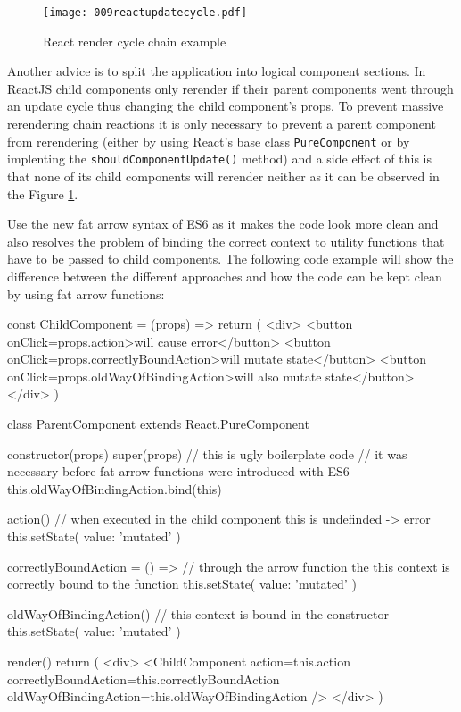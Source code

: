 \begin{figure}
  \centering
  \texttt{[image: 009reactupdatecycle.pdf]}
  \caption{React render cycle chain example}
  \label{fig:reactrerenderchainexample}
\end{figure}

Another advice is to split the application into logical component sections. In ReactJS child components only rerender if their parent components went through an update cycle thus changing the child component's props. To prevent massive rerendering chain reactions it is only necessary to prevent a parent component from rerendering (either by using React's base class \texttt{PureComponent} or by implenting the \texttt{shouldComponentUpdate()} method) and a side effect of this is that none of its child components will rerender neither as it can be observed in the Figure \ref{fig:reactrerenderchainexample}.

Use the new fat arrow syntax of ES6 as it makes the code look more clean and also resolves the problem of binding the correct context to utility functions that have to be passed to child components. The following code example will show the difference between the different approaches and how the code can be kept clean by using fat arrow functions: \newline

\begin{JsCode}
const ChildComponent = (props) => {
  return (
    <div>
      <button onClick={props.action}>will cause error</button>
      <button onClick={props.correctlyBoundAction}>will mutate state</button>
      <button onClick={props.oldWayOfBindingAction}>will also mutate state</button>
    </div>
  )
}

class ParentComponent extends React.PureComponent {
  
  constructor(props) {
  	super(props)
    // this is ugly boilerplate code
    // it was necessary before fat arrow functions were introduced with ES6
    this.oldWayOfBindingAction.bind(this) 
  }
  
  action() {
    // when executed in the child component this is undefinded -> error
  	this.setState({ value: 'mutated' })
  }
  
  correctlyBoundAction = () => {
    // through the arrow function the this context is correctly bound to the function
  	this.setState({ value: 'mutated' })
  }
  
  oldWayOfBindingAction() {
    // this context is bound in the constructor
  	this.setState({ value: 'mutated' })
  }
  
  render() {
  	return (
      <div>
      	<ChildComponent
          action={this.action}
          correctlyBoundAction={this.correctlyBoundAction}
          oldWayOfBindingAction={this.oldWayOfBindingAction}
        />
      </div>
    )
  }
}
\end{JsCode}

